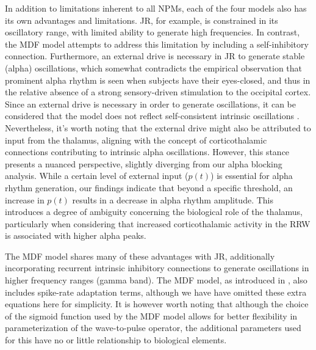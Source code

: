 \documentclass[12pt,twoside]{article}
\begin{document}
In addition to limitations inherent to all NPMs, each of the four models also has its own advantages and limitations.
JR, for example, is constrained in its oscillatory range, with limited ability to generate high frequencies. In contrast, the MDF model attempts to address this limitation by including a self-inhibitory connection. Furthermore, an external drive is necessary in JR to generate stable (alpha) oscillations, which somewhat contradicts the empirical observation that prominent alpha rhythm is seen when subjects have their eyes-closed, and thus in the relative absence of a strong sensory-driven stimulation to the occipital cortex. Since an external drive is necessary in order to generate oscillations, it can be considered that the model does not reflect self-consistent intrinsic oscillations \citep{kiani2021realistic}. Nevertheless, it's worth noting that the external drive might also be attributed to input from the thalamus, aligning with the concept of corticothalamic connections contributing to intrinsic alpha oscillations. However, this stance presents a nuanced perspective, slightly diverging from our alpha blocking analysis. While a certain level of external input ($p(t)$) is essential for alpha rhythm generation, our findings indicate that beyond a specific threshold, an increase in $p(t)$ results in a decrease in alpha rhythm amplitude. This introduces a degree of ambiguity concerning the biological role of the thalamus, particularly when considering that increased corticothalamic activity in the RRW is associated with higher alpha peaks.
 

The MDF model shares many of these advantages with JR, additionally incorporating recurrent intrinsic inhibitory connections to generate oscillations in higher frequency ranges (gamma band). The MDF model, as introduced in \citet{moran2007neural}, also includes spike-rate adaptation terms, although we have have omitted these extra equations here for simplicity. It is however worth noting that although the choice of the sigmoid function used by the MDF model allows for better flexibility in parameterization of the wave-to-pulse operator, the additional parameters used for this have no or little relationship to biological elements. 
\end{document}

